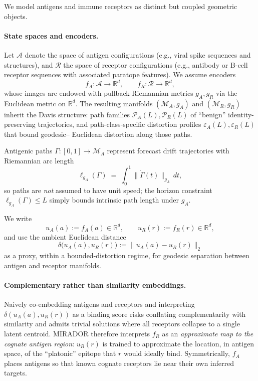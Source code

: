 \documentclass[11pt]{article}
\newcommand{\Rcal}{\mathcal{R}}
\newcommand{\M}{\mathcal{M}}
\newcommand{\Pcal}{\mathcal{P}}
\newcommand{\Acal}{\mathcal{A}}
\begin{document}
We model antigens and immune receptors as distinct but coupled geometric objects.

\paragraph{State spaces and encoders.}
Let $\Acal$ denote the space of antigen configurations (e.g., viral spike sequences and structures),
and $\Rcal$ the space of receptor configurations (e.g., antibody or B-cell receptor sequences with
associated paratope features). We assume encoders
\[
f_A : \Acal \to \mathbb{R}^d, \qquad
f_R : \Rcal \to \mathbb{R}^d,
\]
whose images are endowed with pullback Riemannian metrics $g_A, g_R$ via the Euclidean metric
on $\mathbb{R}^d$. The resulting manifolds $(\M_A, g_A)$ and $(\M_R, g_R)$ inherit the Davis
structure: path families $\Pcal_A(L), \Pcal_R(L)$ of ``benign'' identity-preserving trajectories,
and path-class-specific distortion profiles $\varepsilon_A(L), \varepsilon_R(L)$ that bound geodesic–
Euclidean distortion along those paths.

Antigenic paths $\Gamma : [0,1] \to \M_A$ represent forecast drift trajectories with Riemannian
arc length
\[
\ell_{g_A}(\Gamma)
\;=\;
\int_0^1 \bigl\|\dot{\Gamma}(t)\bigr\|_{g_A}\, dt,
\]
so paths are \emph{not} assumed to have unit speed; the horizon constraint $\ell_{g_A}(\Gamma)\le L$
simply bounds intrinsic path length under $g_A$.

We write
\[
u_A(a) := f_A(a) \in \mathbb{R}^d, \qquad
u_R(r) := f_R(r) \in \mathbb{R}^d,
\]
and use the ambient Euclidean distance
\[
\delta\bigl(u_A(a), u_R(r)\bigr)
:= \bigl\|u_A(a) - u_R(r)\bigr\|_2
\]
as a proxy, within a bounded-distortion regime, for geodesic separation between antigen and
receptor manifolds.

\paragraph{Complementary rather than similarity embeddings.}
Naively co-embedding antigens and receptors and interpreting $\delta(u_A(a), u_R(r))$ as a
binding score risks conflating complementarity with similarity and admits trivial solutions where
all receptors collapse to a single latent centroid. MIRADOR therefore interprets $f_R$ as an
\emph{approximate map to the cognate antigen region}: $u_R(r)$ is trained to approximate the
location, in antigen space, of the ``platonic'' epitope that $r$ would ideally bind. Symmetrically,
$f_A$ places antigens so that known cognate receptors lie near their own inferred targets.
\end{document}
